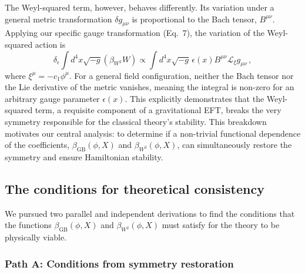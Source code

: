 \documentclass[twocolumn]{aastex631}
\begin{document}
The Weyl-squared term, however, behaves differently. Its variation under a general metric transformation $\delta g_{\mu\nu}$ is proportional to the Bach tensor, $B^{\mu\nu}$. Applying our specific gauge transformation (Eq.~7), the variation of the Weyl-squared action is
\begin{equation}
    \delta_\epsilon \int d^4x \sqrt{-g} (\beta_{W^2} W) \propto \int d^4x \sqrt{-g} \, \epsilon(x) B^{\mu\nu} \mathcal{L}_{\xi} g_{\mu\nu} \,,
\end{equation}
where $\xi^\mu = -c_1 \phi^\mu$. For a general field configuration, neither the Bach tensor nor the Lie derivative of the metric vanishes, meaning the integral is non-zero for an arbitrary gauge parameter $\epsilon(x)$. This explicitly demonstrates that the Weyl-squared term, a requisite component of a gravitational EFT, breaks the very symmetry responsible for the classical theory's stability. This breakdown motivates our central analysis: to determine if a non-trivial functional dependence of the coefficients, $\beta_{\text{GB}}(\phi, X)$ and $\beta_{W^2}(\phi, X)$, can simultaneously restore the symmetry and ensure Hamiltonian stability.

\subsection{The conditions for theoretical consistency}

We pursued two parallel and independent derivations to find the conditions that the functions $\beta_{\text{GB}}(\phi, X)$ and $\beta_{W^2}(\phi, X)$ must satisfy for the theory to be physically viable.

\subsubsection{Path A: Conditions from symmetry restoration}
\end{document}
